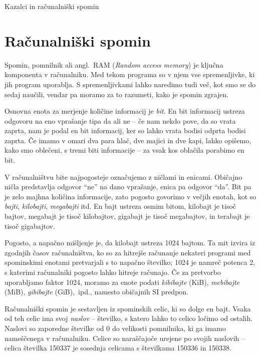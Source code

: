 
Kazalci in računalniški spomin


\section{Računalniški spomin}

Spomin, pomnilnik ali angl.~RAM (\textit{Random access memory})
je ključna komponenta v računalniku. Med tekom programa so v njem vse
spremenljivke, ki jih program uporablja. S spremenljivkami lahko naredimo tudi
več, kot smo se do sedaj naučili, vendar pa moramo za to razumeti, kako je
spomin zgrajen.

Osnovna enota za merjenje količine informacij je \emph{bit}.
En bit informacij ustreza odgovoru na eno vprašanje tipa da ali ne
-- če nam nekdo pove, da so vrata zaprta, nam je podal en bit informacij,
ker so lahko vrata bodisi odprta bodisi zaprta.
Če imamo v omari dva para hlač, dve majici in dve kapi, lahko opišemo,
kako smo oblečeni, s tremi biti informacije -- za vsak kos oblačila porabimo
en bit.

V računalništvu bite najpogosteje označujemo z ničlami in enicami.
Običajno ničla predstavlja odgovor ``ne'' na dano vprašanje,
enica pa odgovor ``da''. Bit pa je zelo majhna količina informacije, zato
pogosto govorimo v večjih enotah, kot so \emph{bajti}, \emph{kilobajti},
\emph{megabajti} itd. En bajt ustreza osmim bitom, kilobajt je tisoč bajtov,
megabajt je tisoč kilobajtov, gigabajt je tisoč megabajtov, in terabajt je
tisoč gigabajtov.

\begin{errors}
  Pogosto, a napačno mišljenje je, da kilobajt ustreza 1024 bajtom.
  Ta mit izvira iz zgodnjih časov računalništva, ko so za hitrejše
  računanje nekateri programi med spominskimi enotami pretvarjali
  s to napačno številko; 1024 je namreč potenca 2, s katerimi računalniki
  pogosto lahko hitreje računajo.
  Če za pretvorbo uporabljamo faktor 1024, moramo za enote podati
  \emph{kibibajte} (KiB), \emph{mebibajte} (MiB), \emph{gibibajte} (GiB),~ipd.,
  namesto običajnih SI predpon.
\end{errors}

Računalniški spomin je sestavljen iz spominskih celic, ki so dolge en bajt.
Vsaka od teh celic ima svoj \emph{naslov} -- številko, s katero lahko to
celico ločimo od ostalih. Naslovi so zaporedne številke od 0 do velikosti
pomnilnika, ki ga imamo nameščenega v računalniku.
Celice so naraščajoče urejene po svojih naslovih -- celica številka 150337 je
sosednja celicama s številkama 150336 in 150338.

